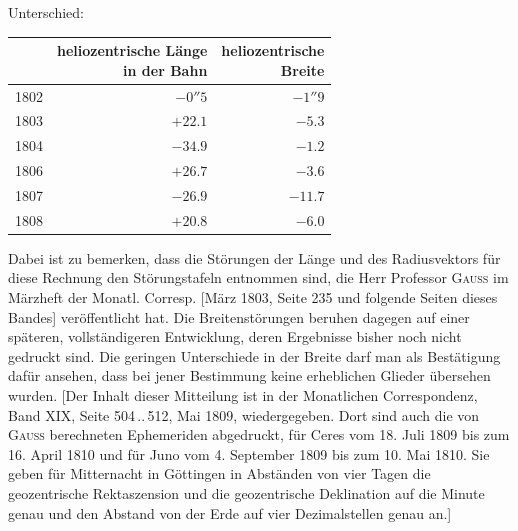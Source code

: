 \begin{center} Unterschied:
\end{center}


\begin{center}\fontsize{10}{12}\selectfont\setlength{\tabcolsep}{5pt}\renewcommand{\arraystretch}{1.15}\begin{tabular}{crr}  & \shortstack{heliozentrische Länge\\in der Bahn} & \shortstack{heliozentrische\\Breite}\\\hline 1802 & $-0''5$ & $-1''9$\\ 1803 & $+22.1$ & $-5.3$\\ 1804 & $-34.9$ & $-1.2$\\ 1806 & $+26.7$ & $-3.6$\\ 1807 & $-26.9$ & $-11.7$\\ 1808 & $+20.8$ & $-6.0$\\
\end{tabular}\end{center}


\par\noindent Dabei ist zu bemerken, dass die Störungen der Länge und des Radiusvektors für diese Rechnung den Störungstafeln entnommen sind, die Herr Professor \textsc{Gauss} im Märzheft der Monatl. Corresp. [März 1803, Seite 235 und folgende Seiten dieses Bandes] veröffentlicht hat. Die Breitenstörungen beruhen dagegen auf einer späteren, vollständigeren Entwicklung, deren Ergebnisse bisher noch nicht gedruckt sind. Die geringen Unterschiede in der Breite darf man als Bestätigung dafür ansehen, dass bei jener Bestimmung keine erheblichen Glieder übersehen wurden. [Der Inhalt dieser Mitteilung ist in der Monatlichen Correspondenz, Band XIX, Seite 504\,..\,512, Mai 1809, wiedergegeben. Dort sind auch die von \textsc{Gauss} berechneten Ephemeriden abgedruckt, für Ceres vom 18. Juli 1809 bis zum 16. April 1810 und für Juno vom 4. September 1809 bis zum 10. Mai 1810. Sie geben für Mitternacht in Göttingen in Abständen von vier Tagen die geozentrische Rektaszension und die geozentrische Deklination auf die Minute genau und den Abstand von der Erde auf vier Dezimalstellen genau an.]

